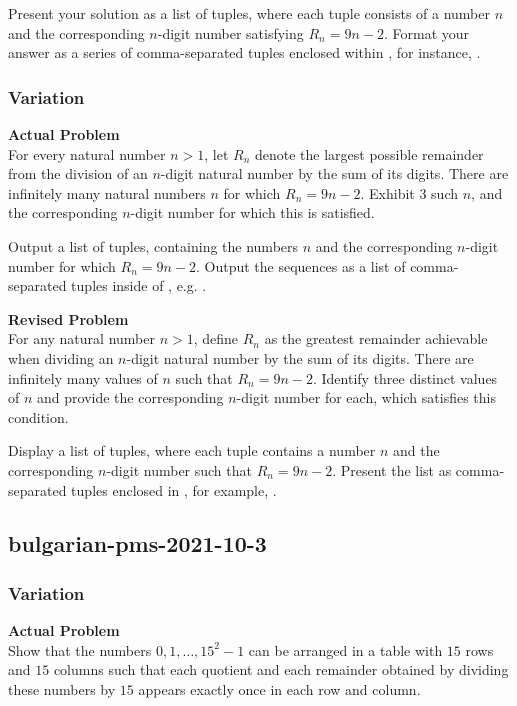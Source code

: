 Present your solution as a list of tuples, where each tuple consists of a number \( n \) and the corresponding \( n \)-digit number satisfying \( R_n = 9n - 2 \). Format your answer as a series of comma-separated tuples enclosed within \boxed, for instance, .

\subsubsection{Variation}
\textbf{Actual Problem}\\
For every natural number $n > 1$, let $R_{n}$ denote the largest possible remainder from the division of an $n$-digit natural number by the sum of its digits. There are infinitely many natural numbers $n$ for which $R_{n} = 9 n - 2$. Exhibit $3$ such $n$, and the corresponding $n$-digit number for which this is satisfied.

Output a list of tuples, containing the numbers $n$ and the corresponding $n$-digit number for which $R_{n} = 9 n - 2$. Output the sequences as a list of comma-separated tuples inside of \boxed, e.g. .

\textbf{Revised Problem}\\
For any natural number \( n > 1 \), define \( R_{n} \) as the greatest remainder achievable when dividing an \( n \)-digit natural number by the sum of its digits. There are infinitely many values of \( n \) such that \( R_{n} = 9n - 2 \). Identify three distinct values of \( n \) and provide the corresponding \( n \)-digit number for each, which satisfies this condition.

Display a list of tuples, where each tuple contains a number \( n \) and the corresponding \( n \)-digit number such that \( R_{n} = 9n - 2 \). Present the list as comma-separated tuples enclosed in \boxed, for example, .

\subsection{bulgarian-pms-2021-10-3}
\subsubsection{Variation}
\textbf{Actual Problem}\\
Show that the numbers $0,1, \ldots, 15^{2}-1$ can be arranged in a table with $15$ rows and $15$ columns such that each quotient and each remainder obtained by dividing these numbers by $15$ appears exactly once in each row and column.


